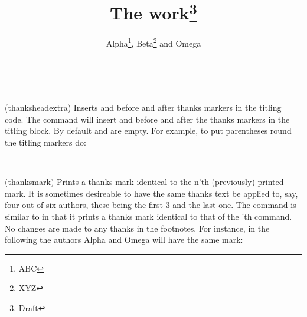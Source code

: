 \begin{syntax}
\cmd{\thanksheadextra} \\
\end{syntax}
\glossary(thanksheadextra)%
  {}%
  {Inserts  and  before and after thanks markers
   in the titling code.}
The \cmd{\thanksheadextra} command will insert
 and  before and after the thanks markers in the
titling block. By default  and  are empty.
For example, to put parentheses round the titling markers do:
\begin{lcode}
\thanksheadextra{(}{)}
\end{lcode}


\begin{syntax}
\cmd{\thanksmark} \\
\end{syntax}
\glossary(thanksmark)%
  {}%
  {Prints a thanks mark identical to the n'th (previously) printed mark.}
It is sometimes desireable to have the same thanks text be applied to,
say, four out of six authors, these being the first 3 and the last one.
The command \cmd{\thanksmark} is similar to 
\cmd{\footnotemark} in that it prints a thanks mark identical
to that of the 'th  \cmd{\thanks} command. No changes are made
to any thanks in the footnotes. For instance, in the following
the authors Alpha and Omega will have the same mark:
\begin{lcode}
\title{The work\thanks{Draft}}
\author{Alpha\thanks{ABC},
        Beta\thanks{XYZ} and 
        Omega} 
\maketitle
\end{lcode}


